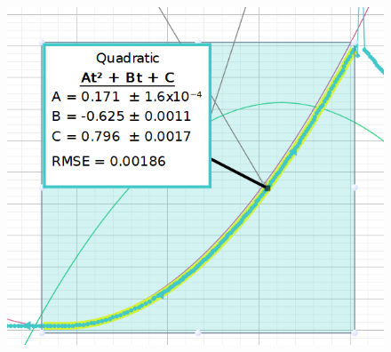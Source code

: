 \documentclass[12pt]{article}
\begin{document}
\begin{center}
\begin{figure}[H]
                \includegraphics[width=\linewidth]{Figure 2 - Position and Fit.png}
            \end{figure}
        \end{center}
\end{document}
